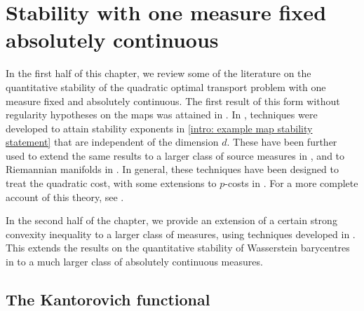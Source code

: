 \documentclass[11pt, oneside, titlepage]{book}
\theoremstyle{plain}
\theoremstyle{definition}
\begin{document}
\chapter{Stability with one measure fixed absolutely continuous}
\label{ch: ac stability}

In the first half of this chapter, we review some of the literature on the quantitative stability of the quadratic optimal transport problem with one measure fixed and absolutely continuous. The first result of this form without regularity hypotheses on the maps was attained in \cite{berman2021convergence}. In \cite{delalande2023quantitative}, techniques were developed to attain stability exponents in \eqref{intro: example map stability statement} that are independent of the dimension $d$. These have been further used to extend the same results to a larger class of source measures in \cite{letrouit2024gluing}, and to Riemannian manifolds in \cite{kitagawa2025stability}. In general, these techniques have been designed to treat the quadratic cost, with some extensions to $p$-costs in \cite{mischler2024quantitative}. For a more complete account of this theory, see \cite{letrouit2025lectures}.

In the second half of the chapter, we provide an extension of a certain strong convexity inequality to a larger class of measures, using techniques developed in \cite{letrouit2024gluing}. This extends the results on the quantitative stability of Wasserstein barycentres in \cite{carlier2024barycentres} to a much larger class of absolutely continuous measures.


\section{The Kantorovich functional}
\end{document}
